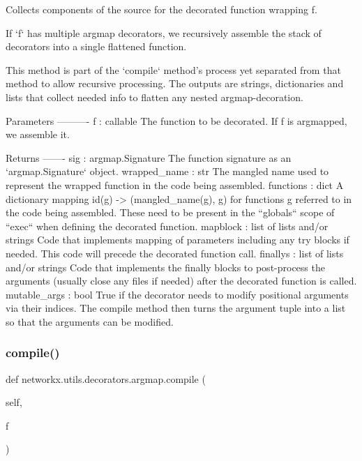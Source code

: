 \begin{DoxyVerb}Collects components of the source for the decorated function wrapping f.

If `f` has multiple argmap decorators, we recursively assemble the stack of
decorators into a single flattened function.

This method is part of the `compile` method's process yet separated
from that method to allow recursive processing. The outputs are
strings, dictionaries and lists that collect needed info to
flatten any nested argmap-decoration.

Parameters
----------
f : callable
    The function to be decorated.  If f is argmapped, we assemble it.

Returns
-------
sig : argmap.Signature
    The function signature as an `argmap.Signature` object.
wrapped_name : str
    The mangled name used to represent the wrapped function in the code
    being assembled.
functions : dict
    A dictionary mapping id(g) -> (mangled_name(g), g) for functions g
    referred to in the code being assembled. These need to be present
    in the ``globals`` scope of ``exec`` when defining the decorated
    function.
mapblock : list of lists and/or strings
    Code that implements mapping of parameters including any try blocks
    if needed. This code will precede the decorated function call.
finallys : list of lists and/or strings
    Code that implements the finally blocks to post-process the
    arguments (usually close any files if needed) after the
    decorated function is called.
mutable_args : bool
    True if the decorator needs to modify positional arguments
    via their indices. The compile method then turns the argument
    tuple into a list so that the arguments can be modified.
\end{DoxyVerb}
 \mbox{\label{classnetworkx_1_1utils_1_1decorators_1_1argmap_ae507473458a8ead357cd44bfd5803ce9}} 
\subsubsection{\texorpdfstring{compile()}{compile()}}
{\footnotesize\ttfamily def networkx.\+utils.\+decorators.\+argmap.\+compile (\begin{DoxyParamCaption}\item[{}]{self,  }\item[{}]{f }\end{DoxyParamCaption})}

